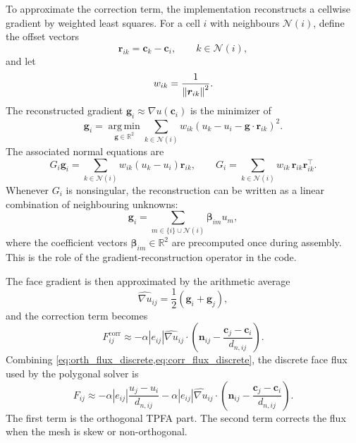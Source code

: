 \documentclass[11pt]{article}
\theoremstyle{plain}
\theoremstyle{definition}
\theoremstyle{remark}
\numberwithin{equation}{section}
\begin{document}
To approximate the correction term, the implementation reconstructs a cellwise gradient by weighted least squares. For a cell $i$ with neighbours $\mathcal{N}(i)$, define the offset vectors
\begin{equation}
\bm{r}_{ik} = \bm{c}_k - \bm{c}_i,
\qquad k \in \mathcal{N}(i),
\end{equation}
and let
\begin{equation}
w_{ik} = \frac{1}{\norm{\bm{r}_{ik}}^2}.
\end{equation}
The reconstructed gradient $\bm{g}_i \approx \nabla u(\bm{c}_i)$ is the minimizer of
\begin{equation}
\label{eq:wls_problem}
\bm{g}_i
= \operatorname*{arg\,min}_{\bm{g} \in \mathbb{R}^2}
\sum_{k \in \mathcal{N}(i)}
w_{ik}
\left(
u_k - u_i - \bm{g} \cdot \bm{r}_{ik}
\right)^2.
\end{equation}
The associated normal equations are
\begin{equation}
\label{eq:wls_normal_equations}
G_i \bm{g}_i
=
\sum_{k \in \mathcal{N}(i)}
w_{ik} (u_k - u_i)\bm{r}_{ik},
\qquad
G_i =
\sum_{k \in \mathcal{N}(i)}
w_{ik}\,\bm{r}_{ik}\bm{r}_{ik}^{\top}.
\end{equation}
Whenever $G_i$ is nonsingular, the reconstruction can be written as a linear combination of neighbouring unknowns:
\begin{equation}
\label{eq:gradient_linear_form}
\bm{g}_i
=
\sum_{m \in \{i\} \cup \mathcal{N}(i)}
\bm{\beta}_{im} u_m,
\end{equation}
where the coefficient vectors $\bm{\beta}_{im} \in \mathbb{R}^2$ are precomputed once during assembly. This is the role of the gradient-reconstruction operator in the code.

The face gradient is then approximated by the arithmetic average
\begin{equation}
\label{eq:face_gradient_average}
\widehat{\nabla u}_{ij}
= \frac{1}{2}(\bm{g}_i + \bm{g}_j),
\end{equation}
and the correction term becomes
\begin{equation}
\label{eq:corr_flux_discrete}
F_{ij}^{\mathrm{corr}}
\approx
- \alpha |e_{ij}|
\widehat{\nabla u}_{ij} \cdot
\left(
\bm{n}_{ij} - \frac{\bm{c}_j - \bm{c}_i}{d_{n,ij}}
\right).
\end{equation}
Combining \cref{eq:orth_flux_discrete,eq:corr_flux_discrete}, the discrete face flux used by the polygonal solver is
\begin{equation}
\label{eq:full_corrected_flux}
F_{ij}
\approx
- \alpha |e_{ij}| \frac{u_j - u_i}{d_{n,ij}}
- \alpha |e_{ij}|
\widehat{\nabla u}_{ij} \cdot
\left(
\bm{n}_{ij} - \frac{\bm{c}_j - \bm{c}_i}{d_{n,ij}}
\right).
\end{equation}
The first term is the orthogonal TPFA part. The second term corrects the flux when the mesh is skew or non-orthogonal.
\end{document}
